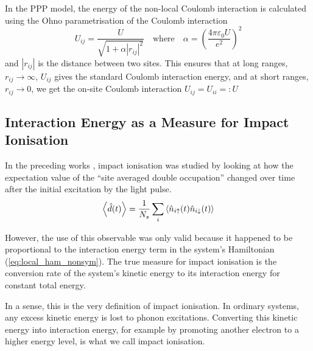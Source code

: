 In the PPP model, the energy of the non-local Coulomb interaction is calculated using the Ohno parametrisation of the Coulomb interaction  \cite{ppp_ohno, hoerbinger}
\begin{equation}
    U_{ij} = \frac{U}{\sqrt{1 + \alpha |r_{ij}|^2}} \quad \text{where} \quad \alpha = \left(\frac{4\pi\varepsilon_0 U}{e^2} \right)^2 \label{eq:ohno_interpolation}
\end{equation}
and $|r_{ij}|$ is the distance between two sites. This ensures that at long ranges, $r_{ij}\to\infty$, $U_{ij}$ gives the standard Coulomb interaction energy, and at short ranges, $r_{ij}\to 0$, we get the on-site Coulomb interaction $U_{ij} = U_{ii} =: U$ 

\subsection{Interaction Energy as a Measure for Impact Ionisation}\label{sec:interaction_energy}
In the preceding works \cite{innerberger,worm_bachelor,worm_project,prauhart}, impact ionisation was studied by looking at how the expectation value of the ``site averaged double occupation'' changed over time after the initial excitation by the light pulse.
\begin{equation}
    \left\langle{\hat{d}(t)}\right\rangle = \frac{1}{N_s}\sum_i \braket{\hat{n}_{i\uparrow}(t)\hat{n}_{i\downarrow}(t)}
\end{equation}

However, the use of this observable was only valid because it happened to be proportional to the interaction energy term in the system's Hamiltonian (\ref{eq:local_ham_nonsym}). The true measure for impact ionisation is the conversion rate of the system's kinetic energy to its interaction energy for constant total energy.

\medskip
In a sense, this is the very definition of impact ionisation. In ordinary systems, any excess kinetic energy is lost to phonon excitations. Converting this kinetic energy into interaction energy, for example by promoting another electron to a higher energy level, is what we call impact ionisation.
\medskip

